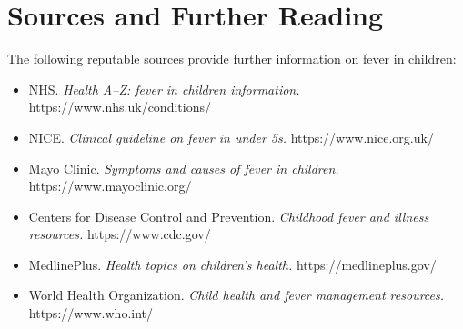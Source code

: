 \section*{Sources and Further Reading}
The following reputable sources provide further information on fever in children:
\begin{itemize}
    \item NHS. \textit{Health A--Z: fever in children information.} https://www.nhs.uk/conditions/
    \item NICE. \textit{Clinical guideline on fever in under 5s.} https://www.nice.org.uk/
    \item Mayo Clinic. \textit{Symptoms and causes of fever in children.} https://www.mayoclinic.org/
    \item Centers for Disease Control and Prevention. \textit{Childhood fever and illness resources.} https://www.cdc.gov/
    \item MedlinePlus. \textit{Health topics on children's health.} https://medlineplus.gov/
    \item World Health Organization. \textit{Child health and fever management resources.} https://www.who.int/
\end{itemize}
